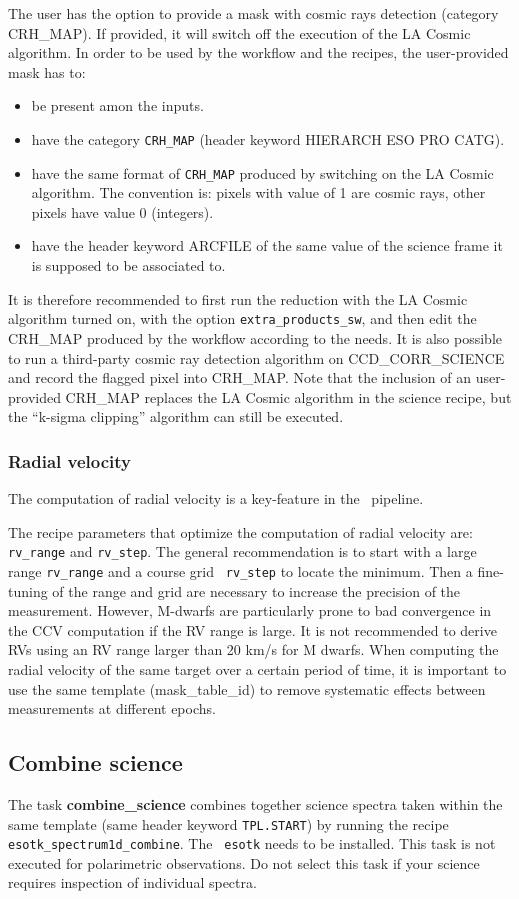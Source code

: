 The user has the option to provide a mask with cosmic rays detection (category CRH\_MAP). If provided, it will
switch off the execution of the LA Cosmic algorithm. In order to be used by the workflow and the recipes, the
user-provided mask has to:
\begin{itemize}
\item be present amon the inputs.
\item have the category {\tt CRH\_MAP} (header keyword HIERARCH ESO PRO CATG).
\item have the same format of {\tt CRH\_MAP} produced by switching on the LA Cosmic algorithm. The convention is: pixels
with value of 1 are cosmic rays, other pixels have value 0 (integers).
\item have the header keyword ARCFILE of the same value of the science frame it is supposed to be associated
  to.
  \end{itemize}
It is therefore recommended to first run the reduction with the LA Cosmic algorithm turned on, with the option
{\tt extra\_products\_sw}, and then edit the CRH\_MAP produced by the workflow according to the needs. It
is also possible to run a third-party cosmic ray detection algorithm on CCD\_CORR\_SCIENCE and record the
flagged pixel into CRH\_MAP.
Note that the inclusion of an user-provided CRH\_MAP replaces the LA Cosmic algorithm in the science recipe,
but the “k-sigma clipping” algorithm can still be executed.



\subsubsection{Radial velocity}
The computation of radial velocity is a key-feature in the
\pipename\ pipeline. 

The recipe parameters that optimize the computation of radial velocity
are: {\tt rv\_range} and {\tt rv\_step}. The general recommendation is
to start with a large range {\tt rv\_range} and a course grid {\tt
  rv\_step} to locate the minimum. Then a fine-tuning of the range and
grid are necessary to increase the precision of the measurement.
However, M-dwarfs are particularly prone to bad convergence in the CCV
computation if the RV range is large.  It is not recommended to derive
RVs using an RV range larger than 20 km/s for M dwarfs.  When
computing the radial velocity of the same target over a certain period
of time, it is important to use the same template (mask\_table\_id) to
remove systematic effects between measurements at different epochs.


\subsection{Combine science}
The task {\bf combine\_science} combines together science spectra
taken within the same template (same header keyword {\tt TPL.START})
by running the recipe {\tt esotk\_spectrum1d\_combine}. The {\tt
  esotk} needs to be installed. This task is not executed for
polarimetric observations.  Do not select this task if your science
requires inspection of individual spectra.
